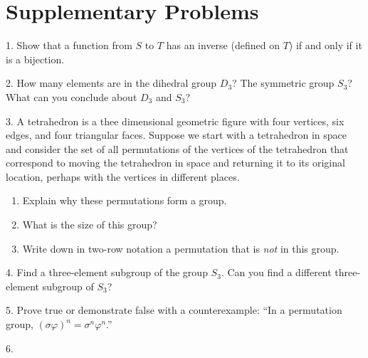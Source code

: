 \documentclass[10pt,]{book}
\theoremstyle{plain}
\theoremstyle{definition}
\theoremstyle{definition}
\numberwithin{equation}{chapter}
\begin{document}
\section[{Supplementary Problems}]{Supplementary Problems}\label{sec_groups-suppprobs}
\begin{exerciselist}
\item[1.]\marginsymbol[-1em]{} \hypertarget{exercise-54}{}\hypertarget{p-1818}{}%
Show that a function from \(S\) to \(T\) has an inverse (defined on \(T\)) if and only if it is a bijection.%
\par\smallskip
\item[2.]\marginsymbol[-1em]{} \hypertarget{exercise-55}{}\hypertarget{p-1819}{}%
How many elements are in the dihedral group \(D_3\)?  The symmetric group \(S_3\)?  What can you conclude about \(D_3\) and \(S_3\)?%
\par\smallskip
\item[3.]\marginsymbol[-1em]{} \hypertarget{exercise-56}{}\hypertarget{p-1821}{}%
A tetrahedron is a thee dimensional geometric figure with four vertices, six edges, and four triangular faces.  Suppose we start with a tetrahedron in space and consider the set of all permutations of the vertices of the tetrahedron that correspond to moving the tetrahedron in space and returning it to its original location, perhaps with the vertices in different places. \leavevmode%
\begin{enumerate}[label=(\alph*)]
\item\hypertarget{li-117}{}Explain why these permutations form a group.%
\item\hypertarget{li-118}{}What is the size of this group?%
\item\hypertarget{li-119}{}Write down in two-row notation a permutation that is \emph{not} in this group.%
\end{enumerate}
%
\par\smallskip
\item[4.]\marginsymbol[-1em]{} \hypertarget{exercise-57}{}\hypertarget{p-1822}{}%
Find a three-element subgroup of the group \(S_3\).  Can you find a different three-element subgroup of \(S_3\)?%
\par\smallskip
\item[5.]\marginsymbol[-1em]{} \hypertarget{exercise-58}{}\hypertarget{p-1824}{}%
Prove true or demonstrate false with a counterexample: ``In a permutation group, \((\sigma\varphi)^n = \sigma^n\varphi^n\).''%
\par\smallskip
\item[6.]\marginsymbol[-1em]{} \hypertarget{exercise-59}{}\hypertarget{p-1825}{}%

\end{exerciselist}
\end{document}
